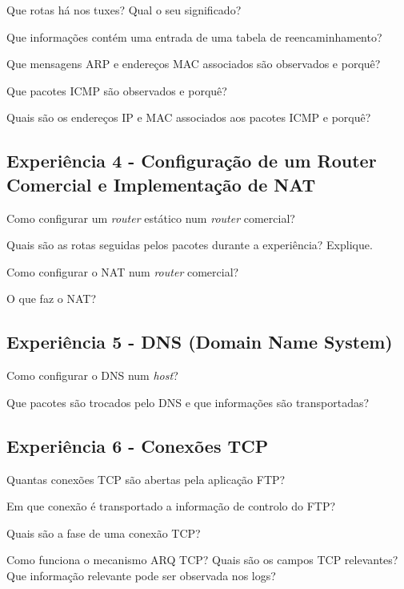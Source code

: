 \documentclass[11pt]{article}
\begin{document}
 Que rotas há nos tuxes? Qual o seu significado?

 Que informações contém uma entrada de uma tabela de reencaminhamento?

 Que mensagens ARP e endereços MAC associados são observados e porquê?

 Que pacotes ICMP são observados e porquê?

 Quais são os endereços IP e MAC associados aos pacotes ICMP e porquê?

\subsection{Experiência 4 - Configuração de um Router Comercial e Implementação de NAT}

 Como configurar um \emph{router} estático num \emph{router} comercial?

 Quais são as rotas seguidas pelos pacotes durante a experiência? Explique.

 Como configurar o NAT num \emph{router} comercial?

 O que faz o NAT?

\subsection{Experiência 5 - DNS (Domain Name System)}

 Como configurar o DNS num \emph{host}?

 Que pacotes são trocados pelo DNS e que informações são transportadas? 

\subsection{Experiência 6 - Conexões TCP}

 Quantas conexões TCP são abertas pela aplicação FTP?

 Em que conexão é transportado a informação de controlo do FTP?

 Quais são a fase de uma conexão TCP?

 Como funciona o mecanismo ARQ TCP? Quais são os campos TCP relevantes? Que informação relevante pode ser observada nos logs?
\end{document}

